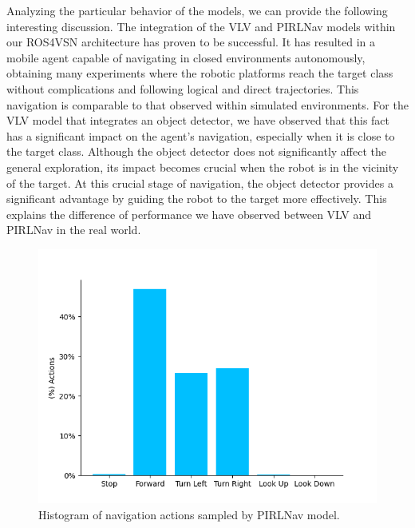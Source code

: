 Analyzing the particular behavior of the models, we can provide the following interesting discussion.
The integration of the VLV and PIRLNav models within our ROS4VSN architecture has proven to be successful.
It has resulted in a mobile agent capable of navigating in closed environments autonomously, obtaining many experiments where the robotic platforms reach the target class without complications and following logical and direct trajectories.
This navigation is comparable to that observed within simulated environments.
For the VLV model that integrates an object detector, we have observed that this fact has a significant impact on the agent's navigation, especially when it is close to the target class.
Although the object detector does not significantly affect the general exploration, its impact becomes crucial when the robot is in the vicinity of the target.
At this crucial stage of navigation, the object detector provides a significant advantage by guiding the robot to the target more effectively.
This explains the difference of performance we have observed between VLV and PIRLNav in the real world.

\begin{figure}[t]
    \centering
        \includegraphics[width=\linewidth]{figures/ros4vsn/histograma_PIRLNav}
        \caption{Histogram of navigation actions sampled by PIRLNav model.}
        \label{fig:histrogram_pirlnav}
\end{figure}

